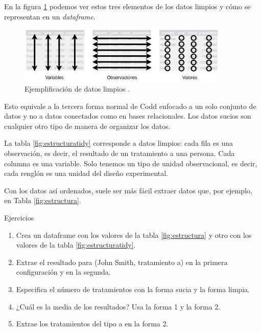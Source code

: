 \documentclass[]{article}
\begin{document}
En la figura \ref{fig:datoslimpios} podemos ver estos tres elementos de
los datos limpios y cómo se representan en un \emph{dataframe}.

\begin{figure}[h]
    \centering
    \includegraphics[width=0.9\textwidth]{../img/datos_limpios.png}
    \caption{Ejemplificación de datos limpios \parencite[][sección Data Tidying]{wickham2016r}.}
    \label{fig:datoslimpios}
\end{figure}

Esto equivale a la tercera forma normal de Codd
\parencite[][p. 4]{wickham2014tidy} enfocado a un solo conjunto de datos
y no a datos conectados como en bases relacionales. Los datos sucios son
cualquier otro tipo de manera de organizar los datos.

La tabla \ref{fig:estructuratidy} corresponde a datos limpios: cada fila
es una observación, es decir, el resultado de un tratamiento a una
persona. Cada columna es una variable. Solo tenemos un tipo de unidad
observacional, es decir, cada renglón es una unidad del diseño
experimental.

Con los datos así ordenados, suele ser más fácil extraer datos que, por
ejemplo, en Tabla \ref{fig:estructura}.

\renewcommand\bcStyleTitre[1]{\large\textcolor{bbblack}{#1}}

\begin{bclogo}[
  couleur=llred,
  arrondi=0,
  logo=\bcstop,
  barre=none,
  noborder=true]{Ejercicios}
\begin{enumerate}
\item Crea un dataframe con los valores de la tabla \ref{fig:estructura} y otro 
con los valores de la tabla \ref{fig:estructuratidy}.
\item Extrae el resultado para (John Smith, tratamiento a) en la primera configuración y en la segunda.
\item Especifica el número de tratamientos con la forma sucia y la forma limpia.
\item ¿Cuál es la media de los resultados? Usa la forma 1 y la forma 2.
\item Extrae los tratamientos del tipo a en la forma 2.
\end{enumerate}

\end{bclogo}
\end{document}
